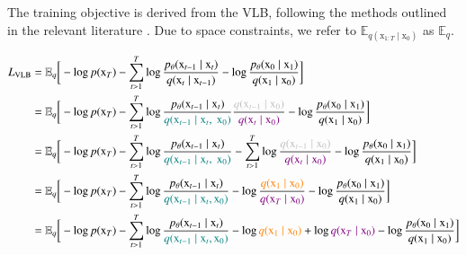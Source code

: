 \noindent The training objective is derived from the VLB, following the methods outlined in the relevant literature \cite{sohldickstein2015deep}\cite{ho2020denoising}\cite{luo2022understanding}. Due to space constraints, we refer to $\mathbb{E}_{q(\mathrm{x}_{1:T}\mid\mathrm{x}_{0})}$ as $\mathbb{E}_{q}$.

\begin{equation}\label{eqn:ELBO2}
    \begin{split}
        L_{\text{\scriptsize{\text{VLB}}}} & = \mathbb{E}_{q}\bigg[-\log p(\mathrm{x}_{T}) - \sum_{t>1}^{T} \log \frac{p_{\theta}(\mathrm{x}_{t-1}\mid\mathrm{x}_{t})}{q(\mathrm{x}_{t}\mid\mathrm{x}_{t-1})}-\log\frac{p_{\theta}(\mathrm{x}_{0}\mid\mathrm{x}_{1})}{q(\mathrm{x}_{1}\mid\mathrm{x}_{0})}\bigg] \\
        & = \mathbb{E}_{q}\bigg[-\log p(\mathrm{x}_{T}) - \sum_{t>1}^{T} \log \frac{p_{\theta}(\mathrm{x}_{t-1}\mid\mathrm{x}_{t})}{\textcolor{teal}{q(\mathrm{x}_{t-1}\mid\mathrm{x}_{t},~\mathrm{x}_{0})}}\frac{\textcolor{lightgray}{q(\mathrm{x}_{t-1}\mid\mathrm{x}_{0})}}{\textcolor{violet}{q(\mathrm{x}_{t}\mid\mathrm{x}_{0})}}-\log\frac{p_{\theta}(\mathrm{x}_{0}\mid\mathrm{x}_{1})}{q(\mathrm{x}_{1}\mid\mathrm{x}_{0})}\bigg] \\
        & = \mathbb{E}_{q}\bigg[-\log p(\mathrm{x}_{T}) - \sum_{t>1}^{T} \log \frac{p_{\theta}(\mathrm{x}_{t-1}\mid\mathrm{x}_{t})}{\textcolor{teal}{q(\mathrm{x}_{t-1}\mid\mathrm{x}_{t},~\mathrm{x}_{0})}} -\sum_{t>1}^{T}\log \frac{\textcolor{lightgray}{q(\mathrm{x}_{t-1}\mid\mathrm{x}_{0})}}{\textcolor{violet}{q(\mathrm{x}_{t}\mid\mathrm{x}_{0})}}-\log\frac{p_{\theta}(\mathrm{x}_{0}\mid\mathrm{x}_{1})}{q(\mathrm{x}_{1}\mid\mathrm{x}_{0})}\bigg] \\
        & = \mathbb{E}_{q}\bigg[-\log p(\mathrm{x}_{T}) - \sum_{t>1}^{T} \log \frac{p_{\theta}(\mathrm{x}_{t-1}\mid\mathrm{x}_{t})}{\textcolor{teal}{q(\mathrm{x}_{t-1}\mid\mathrm{x}_{t}, \mathrm{x}_{0})}}- \log\frac{\textcolor{orange}{q(\mathrm{x}_{1}\mid\mathrm{x}_{0})}}{\textcolor{violet}{q(\mathrm{x}_{T}\mid\mathrm{x}_{0})}} -\log\frac{p_{\theta}(\mathrm{x}_{0}\mid\mathrm{x}_{1})}{q(\mathrm{x}_{1}\mid\mathrm{x}_{0})}\bigg] \\
        & = \mathbb{E}_{q}\bigg[-\log p(\mathrm{x}_{T}) - \sum_{t>1}^{T} \log \frac{p_{\theta}(\mathrm{x}_{t-1}\mid\mathrm{x}_{t})}{\textcolor{teal}{q(\mathrm{x}_{t-1}\mid\mathrm{x}_{t}, \mathrm{x}_{0})}}- \log\textcolor{orange}{q(\mathrm{x}_{1}\mid\mathrm{x}_{0})} + \log \textcolor{violet}{q(\mathrm{x}_{T}\mid\mathrm{x}_{0})} -\log\frac{p_{\theta}(\mathrm{x}_{0}\mid\mathrm{x}_{1})}{q(\mathrm{x}_{1}\mid\mathrm{x}_{0})}\bigg] \\

\end{split}
\end{equation}
